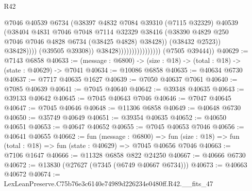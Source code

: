 \begin{lexlean}{R42}
\begin{coremodule}
{                                                @7046
                                                @40539
                                                @6734
                                                (@38397
                                                  @4832
                                                  @7084
                                                  @39310
                                                  (@7115 @32329)
                                                  @40539
                                                  (@38404
                                                    @4831
                                                    @7046
                                                    @7048
                                                    @7114
                                                    @32329
                                                    @38416
                                                    (@38390
                                                      @4829
                                                      @250
                                                      @7046
                                                      @7046
                                                      @4828
                                                      @6734
                                                      (@38425 @4828)
                                                      @38428))
                                                  (@38432 @2523))
                                                @38428))))
                                        (@39505 @39308))
                                      @38428))))))))))))))))
      (@7505 @39444))
@40629 := @7143 @6858
@40633 := (message : @6800) -> (size : @18) -> (total : @18) -> (state : @40629) -> @7041
@40634 := @10086 @6858
@40635 := @40634 @6730
@40637 := @7717 @40635 @1627
@40639 := @7050 @40637 @7061
@40640 := @7085 @40639
@40641 := @7045 @40640
@40642 := @39348 @40635
@40643 := @39133 @40642
@40645 := @7045 @40643 @7046
@40646 := @7047 @40645
@40647 := @7045 @40646
@40648 := @11306 @6858
@40649 := @40648 @6730
@40650 := @35749 @40649
@40651 := @39354 @40635
@40652 := @40650 @40651
@40653 := @40647 @40652
@40655 := @7045 @40653 @7046
@40656 := @40641 @40655
@40662 := fun (message : @6800) =>
  fun (size : @18) => fun (total : @18) => fun (state : @40629) => @7045 @40656 @7046
@40663 := @7106 @1647
@40666 := @11328 @6858 @822 @24250
@40667 := @40666 @6730
@40672 := @13830 (@27627 (@7345 (@6749 @40667 @6734)))
@40673 := @40663 @40672
@40674 := LexLeanPreserve.C75b76e3c6140e74989d226234e0480ff.R42.__fits_47
}
\end{coremodule}
\end{lexlean}
